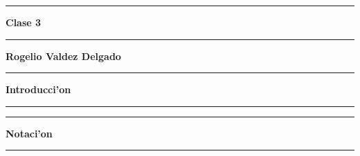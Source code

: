 \documentclass[spanish,11pt]{book}
\newcounter{num}
\newcommand{\Hrule}{\rule{\linewidth}{1mm}}
\newcounter{prob}
\newcounter{sol}
\newcommand{\titulo}[1]{
\def\xxtitulo{#1}
}
\begin{document}
\titulo{
 \thispagestyle{empty}
 \vfill
 \noindent \Hrule
 \begin{flushright}
  {\bf\Huge Clase 3\\[1mm]
}
 \end{flushright}
  \Hrule
 \vfill
 \begin{flushright}
  {\bf\Large 
  Rogelio Valdez Delgado}
 \end{flushright}

\cleardoublepage

}



\frontmatter
\xxtitulo
\setcounter{page}{9}

\thispagestyle{empty}
        \markboth{}{}
	 \Hrule
        \begin{flushright}	
           \huge\bf  Introducci'on
        \end{flushright}
       \Hrule
        \bigskip
		
	\newpage
\tableofcontents
\mainmatter
 
% 
% 
% 
% 
% 
% 
% 
% 
 
\cleardoublepage
{}
\thispagestyle{empty}
        \markboth{}{}
	 \Hrule
        \begin{flushright}	
           \huge\bf  Notaci'on
        \end{flushright}
       \Hrule
	  	

\printindex
\end{document}
